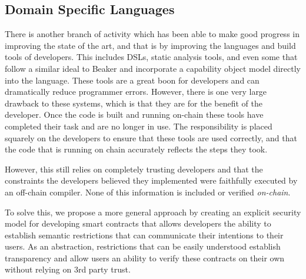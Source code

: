 \documentclass[english,a4paper]{article}
\begin{document}
\subsection{Domain Specific Languages}
There is another branch of activity which has been able to make good progress in
improving the state of the art, and that is by improving the languages and build
tools of developers. This includes DSLs, static
analysis tools, and even some that follow a similar ideal to Beaker and
incorporate a capability object model directly into the language. These tools
are a great boon for developers and can dramatically reduce programmer errors.
However, there is one very large drawback to these systems, which is that they
are for the benefit of the developer. Once the code is built and running
on-chain these tools have completed their task and are no longer in use. The
responsibility is placed squarely on the developers to ensure that these tools
are used correctly, and that the code that is running on chain accurately
reflects the steps they took.

However, this still relies on completely trusting developers and that the
constraints the developers believed they implemented were faithfully executed by
an off-chain compiler. None of this information is included or verified
\emph{on-chain}.

To solve this, we propose a more general approach by creating an
explicit security model for developing smart contracts that allows
developers the ability to establish semantic restrictions that can
communicate their intentions to their users. As an abstraction,
restrictions that can be easily understood establish transparency and
allow users an ability to verify these contracts on their own without
relying on 3rd party trust.
\end{document}

